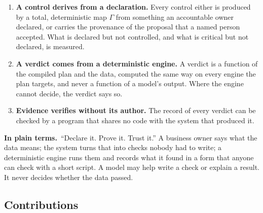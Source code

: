 \documentclass[11pt,a4paper]{article}
\renewcommand{\_}{\oldunderscore\allowbreak}
\theoremstyle{plain}
\theoremstyle{definition}
\theoremstyle{remark}
\newcommand{\Gam}{\Gamma}
\newcommand{\pt}{\textbf{In plain terms.}\ }
\begin{document}
\begin{enumerate}[leftmargin=2em,label=\textbf{J\arabic*.}]
  \item \textbf{A control derives from a declaration.} Every control either is produced by a total,
        deterministic map $\Gam$ from something an accountable owner declared, or carries the provenance
        of the proposal that a named person accepted. What is declared but not controlled, and what is
        critical but not declared, is measured.
  \item \textbf{A verdict comes from a deterministic engine.} A verdict is a function of the compiled plan
        and the data, computed the same way on every engine the plan targets, and never a function of a
        model's output. Where the engine cannot decide, the verdict says so.
  \item \textbf{Evidence verifies without its author.} The record of every verdict can be checked by a
        program that shares no code with the system that produced it.
\end{enumerate}

\begin{plain}
\pt ``Declare it. Prove it. Trust it.'' A business owner says what the data means; the system turns that
into checks nobody had to write; a deterministic engine runs them and records what it found in a form that
anyone can check with a short script. A model may help write a check or explain a result. It never decides
whether the data passed.
\end{plain}

\subsection{Contributions}
\end{document}
